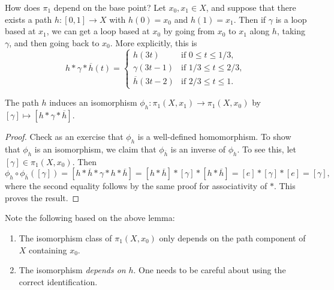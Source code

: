 \begin{remark}
  How does $\pi_1$ depend on the base point? Let
  $x_0, x_1 \in X$, and suppose that there
  exists a path $h : [0, 1] \to X$ with
  $h(0) = x_0$ and $h(1) = x_1$. Then if $\gamma$ is a
  loop based at $x_1$, we can get a loop based at $x_0$
  by going from $x_0$ to $x_1$ along $h$, taking
  $\gamma$, and then going back to $x_0$. More
  explicitly, this is
  \[
    h * \gamma * \overline{h}(t) =
    \begin{cases}
      h(3t) & \text{if } 0 \le t \le 1 / 3, \\
      \gamma(3t - 1) & \text{if } 1 / 3 \le t \le 2 / 3, \\
      \overline{h}(3t - 2) & \text{if } 2 / 3 \le t \le 1.
    \end{cases}
  \]
\end{remark}

\begin{lemma}
  The path $h$ induces an isomorphism
  $\phi_h : \pi_1(X, x_1) \to \pi_1(X, x_0)$
  by $[\gamma] \mapsto [h * \gamma * \overline{h}]$.
\end{lemma}

\begin{proof}
  Check as an exercise that $\phi_h$ is a well-defined
  homomorphism.
  To show that $\phi_h$ is an isomorphism, we claim
  that $\phi_{\overline{h}}$ is an inverse of $\phi_h$.
  To see this, let $[\gamma] \in \pi_1(X, x_0)$. Then
  \[
    \phi_h \circ \phi_{\overline{h}}([\gamma])
    = [h * \overline{h} * \gamma * h * \overline{h}]
    = [h * \overline{h}] * [\gamma] * [h * \overline{h}]
    = [e] * [\gamma] * [e]
    = [\gamma],
  \]
  where the second equality follows by the same
  proof for associativity of $*$. This proves the result.
\end{proof}

\begin{remark}
  Note the following based on the above lemma:
  \begin{enumerate}
    \item The isomorphism class of $\pi_1(X, x_0)$
      only depends on the path component of $X$
      containing $x_0$.
    \item The isomorphism \emph{depends on} $h$.
      One needs to be careful about using
      the correct identification.
  \end{enumerate}
\end{remark}
